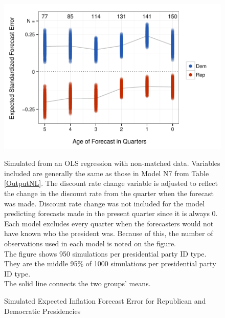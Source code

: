 \documentclass[a4paper]{article}\usepackage{graphicx, color}
\newenvironment{knitrout}{}{} %
\begin{document}
\begin{figure}[t]
    \caption{Simulated Expected Inflation Forecast Error for Republican and Democratic Presidencies}
    \label{ExpectValueParty}
    \begin{center}

\begin{knitrout}
\color{fgcolor}\includegraphics[width=0.8\linewidth]{figure/ExpectValueParty} 
\end{knitrout}





    \end{center}
    \begin{singlespace}
        {\scriptsize{Simulated from an OLS regression with non-matched data. Variables included are generally the same as those in Model N7 from Table \ref{OutputNL}. The discount rate change variable is adjusted to reflect the change in the discount rate from the quarter when the forecast was made. Discount rate change was not included for the model predicting forecasts made in the present quarter since it is always 0. \\ Each model excludes every quarter when the forecasters would not have known who the president was. Because of this, the number of observations used in each model is noted on the figure. \\ The figure shows 950 simulations per presidential party ID type. They are the middle 95\% of 1000 simulations per presidential party ID type. \\ The solid line connects the two groups' means.}}
    \end{singlespace}
\end{figure}
\end{document}
